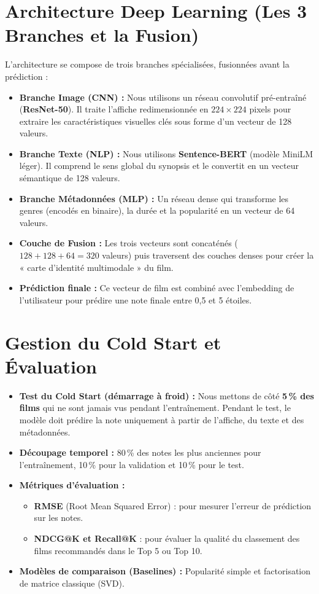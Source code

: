 \documentclass[10pt,a4paper]{article}
\begin{document}
\section{Architecture Deep Learning (Les 3 Branches et la Fusion)}
L'architecture se compose de trois branches spécialisées, fusionnées avant la prédiction :

\begin{itemize}
    \item \textbf{Branche Image (CNN) :} Nous utilisons un réseau convolutif pré-entraîné (\textbf{ResNet-50}). Il traite l'affiche redimensionnée en $224 \times 224$ pixels pour extraire les caractéristiques visuelles clés sous forme d'un vecteur de 128 valeurs.
    \item \textbf{Branche Texte (NLP) :} Nous utilisons \textbf{Sentence-BERT} (modèle MiniLM léger). Il comprend le sens global du synopsis et le convertit en un vecteur sémantique de 128 valeurs.
    \item \textbf{Branche Métadonnées (MLP) :} Un réseau dense qui transforme les genres (encodés en binaire), la durée et la popularité en un vecteur de 64 valeurs.
    \item \textbf{Couche de Fusion :} Les trois vecteurs sont concaténés ($128 + 128 + 64 = 320$ valeurs) puis traversent des couches denses pour créer la « carte d'identité multimodale » du film.
    \item \textbf{Prédiction finale :} Ce vecteur de film est combiné avec l'embedding de l'utilisateur pour prédire une note finale entre 0,5 et 5 étoiles.
\end{itemize}

\section{Gestion du Cold Start et Évaluation}
\begin{itemize}
    \item \textbf{Test du Cold Start (démarrage à froid) :} Nous mettons de côté \textbf{5\,\% des films} qui ne sont jamais vus pendant l'entraînement. Pendant le test, le modèle doit prédire la note uniquement à partir de l'affiche, du texte et des métadonnées.
    \item \textbf{Découpage temporel :} 80\,\% des notes les plus anciennes pour l'entraînement, 10\,\% pour la validation et 10\,\% pour le test.
    \item \textbf{Métriques d'évaluation :} 
    \begin{itemize}
        \item \textbf{RMSE} (Root Mean Squared Error) : pour mesurer l'erreur de prédiction sur les notes.
        \item \textbf{NDCG@K et Recall@K} : pour évaluer la qualité du classement des films recommandés dans le Top 5 ou Top 10.
    \end{itemize}
    \item \textbf{Modèles de comparaison (Baselines) :} Popularité simple et factorisation de matrice classique (SVD).
\end{itemize}
\end{document}
